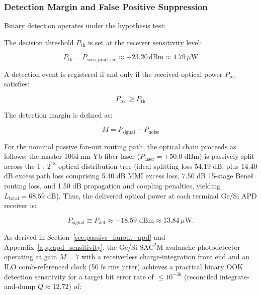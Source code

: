 \documentclass[journal]{IEEEtran}
\begin{document}
\subsubsection{\textbf{Detection Margin and False Positive Suppression}}

Binary detection operates under the hypothesis test:

\begin{center}
\end{center}

\begin{center}
\end{center}

The decision threshold $P_{\mathrm{th}}$ is set at the receiver sensitivity level:

\begin{equation}
P_{\mathrm{th}} = P_{\mathrm{sens,practical}} \approx -23.20\,\text{dBm} \approx 4.79\,\mu\text{W}
\end{equation}

A detection event is registered if and only if the received optical power $P_{\mathrm{rec}}$ satisfies:

\begin{equation}
P_{\mathrm{rec}} \ge P_{\mathrm{th}}
\end{equation}

The detection margin is defined as:

\begin{equation}
M = P_{\text{signal}} - P_{\text{noise}}
\end{equation}

For the nominal passive fan-out routing path, the optical chain proceeds as follows: the master 1064 nm Yb-fiber laser ($P_{\text{laser}} = +50.0\text{ dBm}$) is passively split across the 1 : $2^{18}$ optical distribution tree (ideal splitting loss 54.19 dB, plus 14.40 dB excess path loss comprising 5.40 dB MMI excess loss, 7.50 dB 15-stage Beneš routing loss, and 1.50 dB propagation and coupling penalties, yielding $L_{\text{total}} = 68.59\text{ dB}$). Thus, the delivered optical power at each terminal Ge/Si APD receiver is:

\begin{equation}
P_{\text{signal}} \equiv P_{\text{det}} \approx -18.59\text{ dBm} \approx 13.84\,\mu\text{W}.
\end{equation}

As derived in Section~\ref{sec:passive_fanout_apd} and Appendix~\ref{app:apd_sensitivity}, the Ge/Si $\mathrm{SAC^2M}$ avalanche photodetector operating at gain $M = 7$ with a receiverless charge-integration front end and an ILO comb-referenced clock (50 fs rms jitter) achieves a practical binary OOK detection sensitivity for a target bit error rate of $\le 10^{-36}$ (reconciled integrate-and-dump $Q \approx 12.72$) of:
\end{document}
